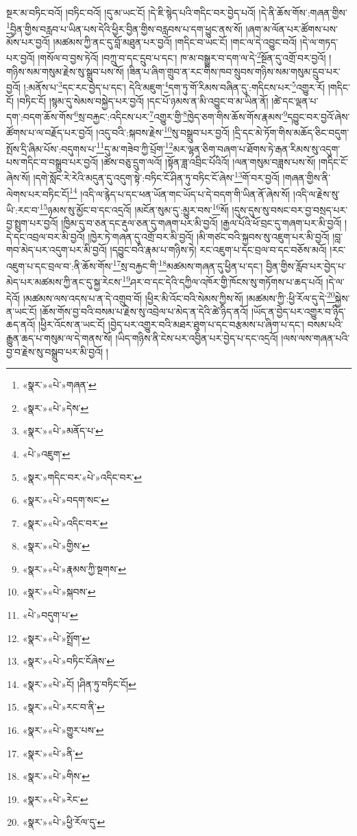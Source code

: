 སྔར་མ་བཏིང་བའོ། །བཏིང་བའོ། །དུ་མ་ཡང་ངོ། །དེ་ཇི་སྙེད་པའི་གདིང་བར་བྱེད་པའོ། །དེ་ནི་ཆོས་གོས་:གཞན་གྱིས་\footnote{«སྣར་»«པེ་»གཞན་}བྱིན་གྱིས་བརླབ་པ་ཡིན་པས་དེའི་ཕྱིར་བྱིན་གྱིས་བརླབས་པ་དག་ཕྱུང་ནས་སོ། །ཞག་མ་ལོན་པར་ཚོགས་པས་མོས་པར་བྱའོ། །མཚམས་ཀྱི་ནང་དུ་བློ་མཐུན་པར་བྱའོ། །གདིང་བ་ཡང་ངོ། །གང་ལ་དེ་འབྱུང་བའོ། །དེ་ལ་གཏད་པར་བྱའོ། །གསོལ་བ་བྱས་ཏེའོ། །བཀྲུ་བ་དང་དྲུབ་པ་དང་། ཁ་མ་བསྒྱུར་བ་དག་ལ་དེ་\footnote{«སྣར་»«པེ་»དེས་}སྔོན་དུ་འགྲོ་བར་བྱའོ། །གཉིས་སམ་གསུམ་རྗེས་སུ་སྒྲུབ་པས་སོ། །ཟིན་པ་ཞིག་གྲུབ་ན་རང་གིས་ཁབ་སྲུབས་གཉིས་སམ་གསུམ་དྲུབ་པར་བྱའོ། །:མནོས་པ་\footnote{«སྣར་»«པེ་»མནོད་པ་}དང་རང་བྱེད་པ་དང་། དེའི་མཇུག་\footnote{«པེ་»འཇུག་}དག་ཏུ་གོ་རིམས་བཞིན་དུ་:གདིངས་པར་\footnote{«སྣར་»གདིང་བར་«པེ་»འདིང་བར་}འགྱུར་རོ། །གདིང་ངོ། །བཏིང་ངོ། །སྙམ་དུ་སེམས་བསྐྱེད་པར་བྱའོ། །དང་པོ་ཉམས་ན་མི་འབྱུང་བ་མ་ཡིན་ནོ། །ཚེ་དང་ལྡན་པ་དག་:བདག་ཆོས་གོས་\footnote{«སྣར་»«པེ་»བདག་སང་}སྲ་བརྐྱང་:འདིངས་པར་\footnote{«སྣར་»«པེ་»འདིང་བར་}འགྱུར་གྱི་\footnote{«སྣར་»«པེ་»གྱིས་}ཁྱེད་ཅག་གིས་ཆོས་གོས་རྣམས་\footnote{«སྣར་»«པེ་»རྣམས་ཀྱི་སྔགས་}དབྱུང་བར་བྱའོ་ཞེས་ཚོགས་པ་ལ་བརྗོད་པར་བྱའོ། །འདུ་བའི་:སྐབས་རྗེས་\footnote{«སྣར་»«པེ་»སྐབས་}སུ་བསྒྲུབ་པར་བྱའོ། །དྲི་དང་མེ་ཏོག་གིས་མཆོད་ཅིང་བདུག་སྤོས་དྲི་ཞིམ་པོས་:བདུགས་པ་\footnote{«པེ་»བདུག་པ་}དུ་མ་གཟེབ་ཀྱི་པྲོག་\footnote{«སྣར་»«པེ་»སྤྲོག་}མར་ལྷན་ཅིག་བཞག་པ་ཐོགས་ཏེ་རྒན་རིམས་སུ་འདུག་པས་གདིང་བ་བསྒྲུབ་པར་བྱའོ། །ཚེས་བཅུ་དྲུག་ལའོ། །སྟོན་ཟླ་འབྲིང་པོའིའོ། །ལན་གསུམ་བཟླས་པས་སོ། །གདིང་ངོ་ཞེས་སོ། །དགེ་སློང་རེ་རེའི་མདུན་དུ་འདུག་སྟེ་:བཏིང་ངོ་ཤིན་ཏུ་བཏིང་ངོ་ཞེས་\footnote{«སྣར་»«པེ་»བཏིང་ངོཞེས་}གོ་བར་བྱའོ། །གཞན་གྱིས་ནི་ལེགས་པར་བཏིང་ངོ།\footnote{«སྣར་»«པེ་»ངོ། །ཤིན་ཏུ་བཏིང་ངོ།} །འདི་ལ་རྙེད་པ་དང་ཕན་ཡོན་གང་ཡོད་པ་དེ་བདག་གི་ཡིན་ནོ་ཞེས་སོ། །འདི་ལ་རྗེས་སུ་ཡི་:རང་བ་\footnote{«སྣར་»«པེ་»རང་བ་ནི་}ཉམས་སུ་མྱོང་བ་དང་འདྲའོ། །མངོན་སུམ་དུ་:མྱུར་བས་\footnote{«སྣར་»«པེ་»གྱུར་པས་}སོ། །དུས་དུས་སུ་བསང་བར་བྱ་བསྲད་པར་བྱ་སྤྲུག་པར་བྱའོ། །ཁྱིམ་དུ་བ་ཅན་དང་རྡུལ་ཅན་དུ་གཞག་པར་མི་བྱའོ། །རྒྱལ་པོའི་ཕོ་བྲང་དུ་གཞག་པར་མི་བྱའོ། །དེ་དང་འབྲལ་བར་མི་བྱའོ། །ཁྱེར་ཏེ་གཞན་དུ་འགྲོ་བར་མི་བྱའོ། །མི་གཙང་བའི་སྐྱབས་སུ་འཇུག་པར་མི་བྱའོ། །བླ་གབ་མེད་པར་འདུག་པར་མི་བྱའོ། །དབྱུང་བའི་རྣམ་པ་གཉིས་ཏེ། རང་འཇུག་པ་དང་བྲལ་བ་དང་བཅོས་མའོ། །རང་འཇུག་པ་དང་བྲལ་བ་:ནི་ཆོས་གོས་\footnote{«སྣར་»«པེ་»ནི་}སྲ་བརྐྱང་གི་\footnote{«སྣར་»«པེ་»གིས་}མཚམས་གཞན་དུ་ཕྱིན་པ་དང་། བྱིན་གྱིས་རློབ་པར་བྱེད་པ་མེད་པར་མཚམས་ཀྱི་ནང་དུ་སྐྱ་རེངས་\footnote{«སྣར་»«པེ་»རེང་}ཤར་བ་དང་དེའི་དཀྱིལ་འཁོར་གྱི་ཁོངས་སུ་གཏོགས་པ་ཆད་པའོ། །དེ་ལ་དེའོ། །མཚམས་ལས་འདས་པ་ན་དེ་འགྲུབ་བོ། །ཕྱིར་མི་འོང་བའི་སེམས་ཀྱིས་སོ། །མཚམས་ཀྱི་:ཕྱི་རོལ་དུ་དེ་\footnote{«སྣར་»«པེ་»ཕྱི་རོལ་དུ་}སྐྱེས་ན་ཡང་ངོ། །ཆོས་གོས་བྱ་བའི་བསམ་པ་རྗེས་སུ་འབྲེལ་པ་མེད་ན་དེའི་ཚེ་ཉིད་ནའོ། །ཡོད་ན་བྱེད་པར་འགྱུར་བ་ཉིད་ཆད་ནའོ། །ཕྱིར་འོངས་ན་ཡང་ངོ། །བྱེད་པར་འགྱུར་བའི་མཐར་ཐུག་པ་དང་བརྩམས་པ་ཞིག་པ་དང་། བསམ་པའི་རྒྱུན་ཆད་པ་གསུམ་ལ་དེ་གནས་སོ། །ཡིད་གཉིས་ནི་ངེས་པར་འབྱིན་པར་བྱེད་པ་དང་འདྲའོ། །ལས་ལས་གཞན་པའི་བྱ་བ་རྗེས་སུ་བསྒྲུབ་པར་མི་བྱའོ། །
